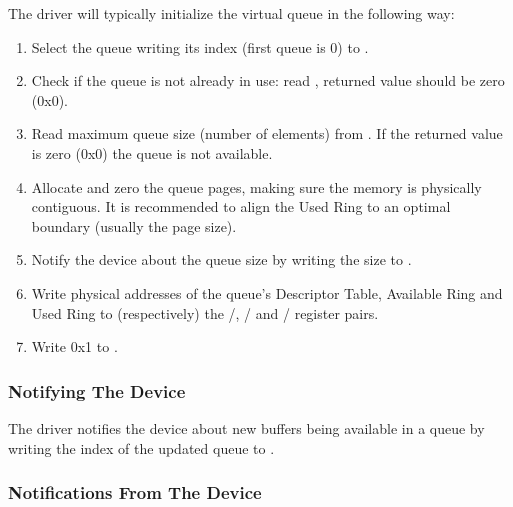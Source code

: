 The driver will typically initialize the virtual queue in the following way:

\begin{enumerate}
\item Select the queue writing its index (first queue is 0) to
   .

\item Check if the queue is not already in use: read ,
   returned value should be zero (0x0).

\item Read maximum queue size (number of elements) from
   . If the returned value is zero (0x0) the
   queue is not available.

\item Allocate and zero the queue pages, making sure the memory
   is physically contiguous. It is recommended to align the
   Used Ring to an optimal boundary (usually the page size).

\item Notify the device about the queue size by writing the size to
   .

\item Write physical addresses of the queue's Descriptor Table,
   Available Ring and Used Ring to (respectively) the
   /,
   / and
   / register pairs.

\item Write 0x1 to .
\end{enumerate}

\subsubsection{Notifying The Device}\label{sec:Virtio Transport Options / Virtio Over MMIO / MMIO-specific Initialization And Device Operation / Notifying The Device}

The driver notifies the device about new buffers being available in
a queue by writing the index of the updated queue to .

\subsubsection{Notifications From The Device}\label{sec:Virtio Transport Options / Virtio Over MMIO / MMIO-specific Initialization And Device Operation / Notifications From The Device}

